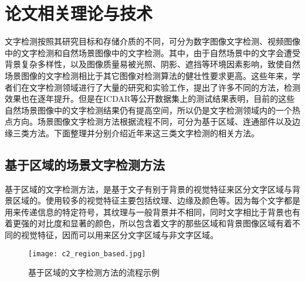﻿%
%
%
%
%
%

\chapter{论文相关理论与技术}

    文字检测按照其研究目标和存储介质的不同，可分为数字图像文字检测、视频图像中的文字检测和自然场景图像中的文字检测。其中，由于自然场景中的文字会遭受背景复杂多样性，以及图像质量易被光照、阴影、遮挡等环境因素影响，致使自然场景图像的文字检测相比于其它图像对检测算法的健壮性要求更高。这些年来，学者们在文字检测领域进行了大量的研究和实验工作，提出了许多不同的方法，检测效果也在逐年提升。但是在ICDAR等公开数据集上的测试结果表明，目前的这些自然场景图像中的文字检测结果仍有提高空间，所以仍是文字检测领域内的一个热点方向。场景图像文字检测方法根据流程不同，可分为基于区域、连通部件以及边缘三类方法。下面整理并分别介绍近年来这三类文字检测的相关方法。

    \section{基于区域的场景文字检测方法}

    基于区域的文字检测方法，是基于文子有别于背景的视觉特征来区分文字区域与背景区域的。使用较多的视觉特征主要包括纹理、边缘及颜色等。因为每个文字都是用来传递信息的特定符号，其纹理与一般背景并不相同，同时文字相比于背景也有着更强的对比度和显著的颜色，所以包含着文字的那些区域和背景图像区域有着不同的视觉特征，因而可以用来区分文字区域与非文字区域。

    \begin{figure}[!h]
    \centering
    \texttt{[image: c2\_region\_based.jpg]}
    \caption{基于区域的文字检测方法的流程示例}
    \label{fig.c2_region_based}
    \end{figure}

